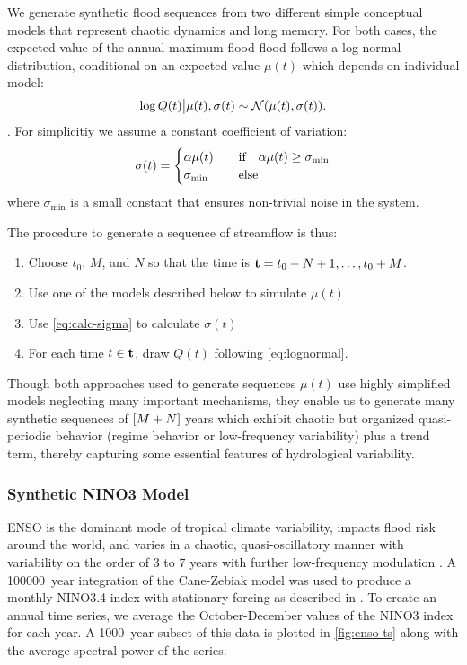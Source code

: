 \documentclass[12pt]{article}
\begin{document}
We generate synthetic flood sequences from two different simple conceptual models that represent chaotic dynamics and long memory.
For both cases, the expected value of the annual maximum flood flood follows a log-normal distribution, conditional on an expected value $\mu(t)$ which depends on individual model:
\begin{equation} \label{eq:lognormal}
  \log Q(t) \big| \mu(t),\sigma(t) \sim \mathcal{N} \qty(\mu(t), \sigma(t)).
\end{equation}.
For simplicitiy we assume a constant coefficient of variation:
\begin{equation}\label{eq:calc-sigma}
  \sigma(t) = 
  \begin{cases} 
    \alpha \mu(t) & \qqtext{if} \alpha \mu(t) \geq \sigma_\text{min} \\ 
    \sigma_\text{min} & \qqtext{else}
  \end{cases}
\end{equation}
where $\sigma_\text{min}$ is a small constant that ensures non-trivial noise in the system.

The procedure to generate a sequence of streamflow is thus:
\begin{enumerate}
  \item Choose $t_0$, $M$, and $N$ so that the time is $\vb{t}=t_0-N+1, \ldots, t_0+M$.
  \item Use one of the models described below to simulate $\mu(t)$
  \item Use \cref{eq:calc-sigma} to calculate $\sigma(t)$
  \item For each time $t \in \vb{t}$, draw $Q(t)$ following \cref{eq:lognormal}.
\end{enumerate}
Though both approaches used to generate sequences $\mu(t)$ use highly simplified models neglecting many important mechanisms, they enable us to generate many synthetic sequences of $\qty[M + N]$ years which exhibit chaotic but organized quasi-periodic behavior (regime behavior or low-frequency variability) plus a trend term, thereby capturing some essential features of hydrological variability.

\subsubsection{Synthetic NINO3 Model\label{sec:methods-nino}}

ENSO is the dominant mode of tropical climate variability, impacts flood risk around the world, and varies in a chaotic, quasi-oscillatory manner with variability on the order of 3 to 7 years with further low-frequency modulation \citep{Sarachik2010}.
A \SI{100000}{year} integration of the Cane-Zebiak model \citep{Zebiak1987} was used to produce a monthly NINO3.4 index with stationary forcing as described in \citet{Ramesh2017}.
To create an annual time series, we average the October-December values of the NINO3 index for each year.
A \SI{1000}{year} subset of this data is plotted in \cref{fig:enso-ts} along with the average spectral power of the series.
\end{document}
